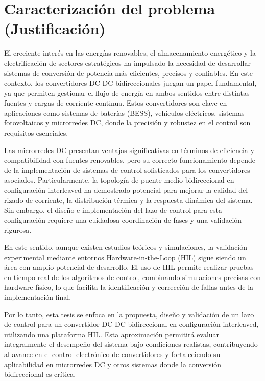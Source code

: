 \clearpage\section{Caracterización del problema (Justificación)}
El creciente interés en las energías renovables, el almacenamiento energético y la electrificación de sectores estratégicos ha impulsado la necesidad de desarrollar sistemas de conversión de potencia más eficientes, precisos y confiables. En este contexto, los convertidores DC-DC bidireccionales juegan un papel fundamental, ya que permiten gestionar el flujo de energía en ambos sentidos entre distintas fuentes y cargas de corriente continua. Estos convertidores son clave en aplicaciones como sistemas de baterías (BESS), vehículos eléctricos, sistemas fotovoltaicos y microrredes DC, donde la precisión y robustez en el control son requisitos esenciales.

Las microrredes DC presentan ventajas significativas en términos de eficiencia y compatibilidad con fuentes renovables, pero su correcto funcionamiento depende de la implementación de sistemas de control sofisticados para los convertidores asociados. Particularmente, la topología de puente medio bidireccional en configuración interleaved ha demostrado potencial para mejorar la calidad del rizado de corriente, la distribución térmica y la respuesta dinámica del sistema. Sin embargo, el diseño e implementación del lazo de control para esta configuración requiere una cuidadosa coordinación de fases y una validación rigurosa.

En este sentido, aunque existen estudios teóricos y simulaciones, la validación experimental mediante entornos Hardware-in-the-Loop (HIL) sigue siendo un área con amplio potencial de desarrollo. El uso de HIL permite realizar pruebas en tiempo real de los algoritmos de control, combinando simulaciones precisas con hardware físico, lo que facilita la identificación y corrección de fallas antes de la implementación final.

Por lo tanto, esta tesis se enfoca en la propuesta, diseño y validación de un lazo de control para un convertidor DC-DC bidireccional en configuración interleaved, utilizando una plataforma HIL. Esta aproximación permitirá evaluar integralmente el desempeño del sistema bajo condiciones realistas, contribuyendo al avance en el control electrónico de convertidores y fortaleciendo su aplicabilidad en microrredes DC y otros sistemas donde la conversión bidireccional es crítica.